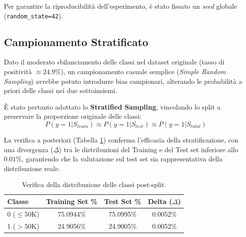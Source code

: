 Per garantire la riproducibilità dell'esperimento, è stato fissato un \textit{seed} globale (\texttt{random\_state=42}).

\subsection{Campionamento Stratificato}
Dato il moderato sbilanciamento delle classi nel dataset originale (tasso di positività $\approx 24.9\%$), un campionamento casuale semplice (\textit{Simple Random Sampling}) avrebbe potuto introdurre bias campionari, alterando le probabilità a priori delle classi nei due sottoinsiemi.

\noindent
È stato pertanto adottato lo \textbf{Stratified Sampling}, vincolando lo split a preservare la proporzione originale delle classi:
\begin{equation}
    P(y=1 | S_{train}) \approx P(y=1 | S_{test}) \approx P(y=1 | S_{total})
\end{equation}

\noindent
La verifica a posteriori (Tabella \ref{tab:split_verify}) conferma l'efficacia della stratificazione, con una divergenza ($\Delta$) tra le distribuzioni del Training e del Test set inferiore allo $0.01\%$, garantendo che la valutazione sul test set sia rappresentativa della distribuzione reale.

\begin{table}[h]
\centering
\begin{tabular}{lccc}
\toprule
\textbf{Classe} & \textbf{Training Set \%} & \textbf{Test Set \%} & \textbf{Delta ($\Delta$)} \\
\midrule
0 ($\le$50K) & 75.0944\% & 75.0995\% & 0.0052\% \\
1 ($>$50K) & 24.9056\% & 24.9005\% & 0.0052\% \\
\bottomrule
\end{tabular}
\caption{Verifica della distribuzione delle classi post-split.}
\label{tab:split_verify}
\end{table}
